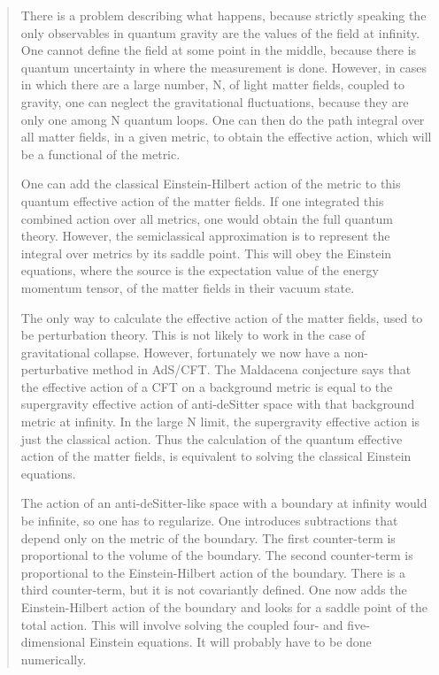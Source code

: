 \begin{quote}
     There is a problem describing what happens, because strictly speaking
     the only observables in quantum gravity are the values of the field
     at infinity.  One cannot define the field at some point in the middle,
     because there is quantum uncertainty in where the measurement is
     done.  However, in cases in which there are a large number, N, of 
     light matter fields, coupled to gravity, one can neglect the 
     gravitational fluctuations, because they are only one among N 
     quantum loops. One can then do the path integral over all matter 
     fields, in a given metric, to obtain the effective action, which 
     will be a functional of the metric.

     One can add the classical Einstein-Hilbert action of the metric to
     this quantum effective action of the matter fields.  If one integrated
     this combined action over all metrics, one would obtain the full
     quantum theory. However, the semiclassical approximation is to
     represent the integral over metrics by its saddle point.  This will
     obey the Einstein equations, where the source is the expectation value
     of the energy momentum tensor, of the matter fields in their vacuum
     state.

     The only way to calculate the effective action of the matter fields,
     used to be perturbation theory. This is not likely to work in the case
     of gravitational collapse. However, fortunately we now have a
     non-perturbative method in AdS/CFT.  The Maldacena conjecture says
     that the effective action of a CFT on a background metric is equal to
     the supergravity effective action of anti-deSitter space with that
     background metric at infinity. In the large N limit, the supergravity
     effective action is just the classical action. Thus the calculation
     of the quantum effective action of the matter fields, is equivalent to
     solving the classical Einstein equations.

     The action of an anti-deSitter-like space with a boundary at
     infinity would be infinite, so one has to regularize.  One 
     introduces subtractions that depend only on the metric of the boundary.
     The first counter-term is proportional to the volume of the boundary. 
     The second counter-term is proportional to the Einstein-Hilbert action
     of the boundary.  There is a third counter-term, but it is not 
     covariantly defined.  One now adds the Einstein-Hilbert action of 
     the boundary and looks for a saddle point of the total action.  
     This will involve solving the coupled four- and five-dimensional 
     Einstein equations. It will probably have to be done numerically.


\end{quote}
